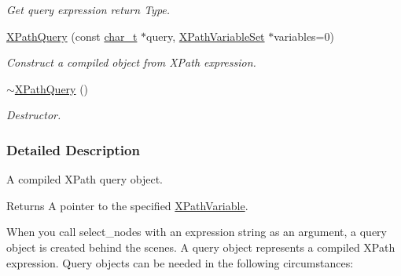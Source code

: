\begin{DoxyCompactItemize}
\begin{DoxyCompactList}\small\item\em Get query expression return Type. \item\end{DoxyCompactList}\item 
\hyperlink{classphys_1_1xml_1_1XPathQuery_a1a63135370ef4999f3dd27540c9009a2}{XPathQuery} (const \hyperlink{namespacephys_1_1xml_afc87705cd1c2917d87b879715a2d8f6e}{char\_\-t} $\ast$query, \hyperlink{classphys_1_1xml_1_1XPathVariableSet}{XPathVariableSet} $\ast$variables=0)
\begin{DoxyCompactList}\small\item\em Construct a compiled object from XPath expression. \item\end{DoxyCompactList}\item 
\hypertarget{classphys_1_1xml_1_1XPathQuery_a063a1c4513d62695ae73c981f2050dc4}{
\hyperlink{classphys_1_1xml_1_1XPathQuery_a063a1c4513d62695ae73c981f2050dc4}{$\sim$XPathQuery} ()}
\label{classphys_1_1xml_1_1XPathQuery_a063a1c4513d62695ae73c981f2050dc4}

\begin{DoxyCompactList}\small\item\em Destructor. \item\end{DoxyCompactList}\end{DoxyCompactItemize}


\subsubsection{Detailed Description}
A compiled XPath query object. \begin{DoxyReturn}{Returns}
A pointer to the specified \hyperlink{classphys_1_1xml_1_1XPathVariable}{XPathVariable}.
\end{DoxyReturn}
When you call select\_\-nodes with an expression string as an argument, a query object is created behind the scenes. A query object represents a compiled XPath expression. Query objects can be needed in the following circumstances: \par

